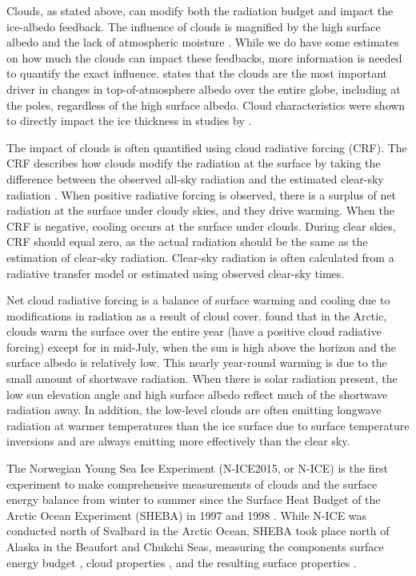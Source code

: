 Clouds, as stated above, can modify both the radiation budget and impact the ice-albedo feedback. The influence of clouds is magnified by the high surface albedo and the lack of atmospheric moisture \citep{shupe:2003}. While we do have some estimates on how much the clouds can impact these feedbacks, more information is needed to quantify the exact influence. \citet{sledd:2019} states that the clouds are the most important driver in changes in top-of-atmosphere albedo over the entire globe, including at the poles, regardless of the high surface albedo. Cloud characteristics were shown to directly impact the ice thickness in studies by \citet{curry:1992, beesley:2007}.  

The impact of clouds is often quantified using cloud radiative forcing (CRF). The CRF describes how clouds modify the radiation at the surface by taking the difference between the observed all-sky radiation and the estimated clear-sky radiation \citep{ramanathan:1989}. When positive radiative forcing is observed, there is a surplus of net radiation at the surface under cloudy skies, and they drive warming. When the CRF is negative, cooling occurs at the surface under clouds. During clear skies, CRF should equal zero, as the actual radiation should be the same as the estimation of clear-sky radiation. Clear-sky radiation is often calculated from a radiative transfer model or estimated using observed clear-sky times.

Net cloud radiative forcing is a balance of surface warming and cooling due to modifications in radiation as a result of cloud cover. \citet{curry:1992, intrieri:2002} found that in the Arctic, clouds warm the surface over the entire year (have a positive cloud radiative forcing) except for in mid-July, when the sun is high above the horizon and the surface albedo is relatively low. This nearly year-round warming is due to the small amount of shortwave radiation. When there is solar radiation present, the low sun elevation angle and high surface albedo reflect much of the shortwave radiation away. In addition, the low-level clouds are often emitting longwave radiation at warmer temperatures than the ice surface due to surface temperature inversions \citep{shupe:2003} and are always emitting more effectively than the clear sky.

The Norwegian Young Sea Ice Experiment (N-ICE2015, or N-ICE) \citep{granskog:2018} is the first experiment to make comprehensive measurements of clouds and the surface energy balance from winter to summer since the Surface Heat Budget of the Arctic Ocean Experiment (SHEBA) in 1997 and 1998 \citep{walden:2017, uttal:2002}. While N-ICE was conducted north of Svalbard in the Arctic Ocean, SHEBA took place north of Alaska in the Beaufort and Chukchi Seas, measuring the components surface energy budget \citep{persson:2002, andreas:2010, grachev:2007}, cloud properties \citep{turner:2005, turner:2002, intrieri:2002, shupe:2004}, and the resulting surface properties \citep{intrieri:2002, shupe:2004}. 

